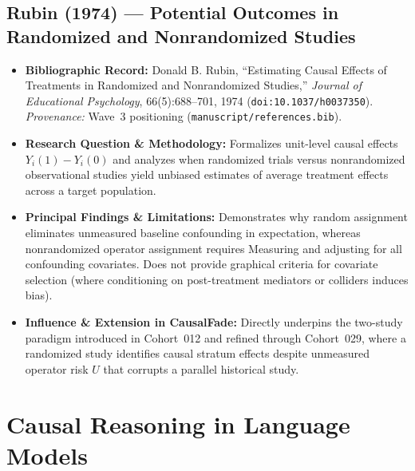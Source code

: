 \subsection{Rubin (1974) --- Potential Outcomes in Randomized and Nonrandomized Studies \citep{rubin1974estimating}}
\begin{itemize}
  \item \textbf{Bibliographic Record:} Donald B. Rubin, ``Estimating Causal Effects of Treatments in Randomized and Nonrandomized Studies,'' \emph{Journal of Educational Psychology}, 66(5):688--701, 1974 (\texttt{doi:10.1037/h0037350}). \emph{Provenance:} Wave~3 positioning (\texttt{manuscript/references.bib}).
  \item \textbf{Research Question \& Methodology:} Formalizes unit-level causal effects $Y_i(1) - Y_i(0)$ and analyzes when randomized trials versus nonrandomized observational studies yield unbiased estimates of average treatment effects across a target population.
  \item \textbf{Principal Findings \& Limitations:} Demonstrates why random assignment eliminates unmeasured baseline confounding in expectation, whereas nonrandomized operator assignment requires Measuring and adjusting for all confounding covariates. Does not provide graphical criteria for covariate selection (where conditioning on post-treatment mediators or colliders induces bias).
  \item \textbf{Influence \& Extension in CausalFade:} Directly underpins the two-study paradigm introduced in Cohort~012 and refined through Cohort~029, where a randomized study identifies causal stratum effects despite unmeasured operator risk $U$ that corrupts a parallel historical study.
\end{itemize}

\section{Causal Reasoning in Language Models}

